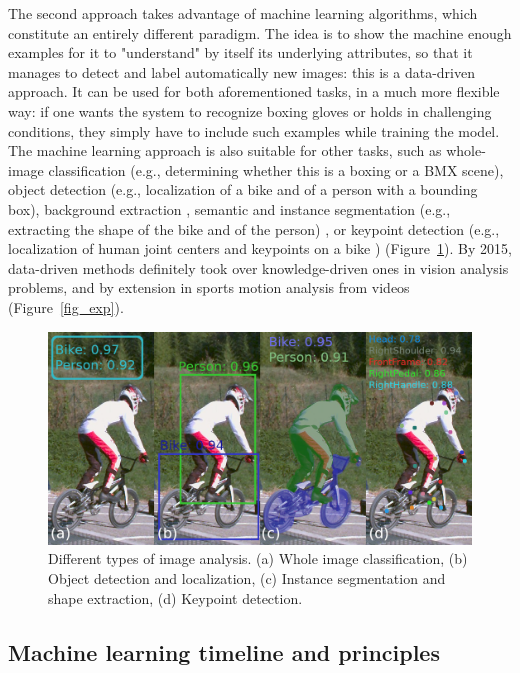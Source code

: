 The second approach takes advantage of machine learning algorithms, which constitute an entirely different paradigm. The idea is to show the machine enough examples for it to "understand" by itself its underlying attributes, so that it manages to detect and label automatically new images: this is a data-driven approach. It can be used for both aforementioned tasks, in a much more flexible way: if one wants the system to recognize boxing gloves or holds in challenging conditions, they simply have to include such examples while training the model. The machine learning approach is also suitable for other tasks, such as whole-image classification (e.g., determining whether this is a boxing or a BMX scene), object detection (e.g., localization of a bike and of a person with a bounding box), background extraction \cite{Bouwmans2019}, semantic and instance segmentation (e.g., extracting the shape of the bike and of the person) \cite{Minaee2021}, or keypoint detection (e.g., localization of human joint centers and keypoints on a bike \cite{Chen2020}) (Figure~\ref{fig_classif_detec}). By 2015, data-driven methods definitely took over knowledge-driven ones in vision analysis problems, and by extension in sports motion analysis from videos (Figure~\ref{fig_exp}).

\clearpage
\begin{figure}[!ht]
	\centering
	\def\svgwidth{1\columnwidth}
	\fontsize{10pt}{10pt}\selectfont
	\includegraphics[width=\linewidth]{"../Chap2/Figures/Fig_classif_detec.png"}
	\caption{Different types of image analysis. (a) Whole image classification, (b) Object detection and localization, (c) Instance segmentation and shape extraction, (d) Keypoint detection.}
	\label{fig_classif_detec}
\end{figure}

\subsection{Machine learning timeline and principles}

